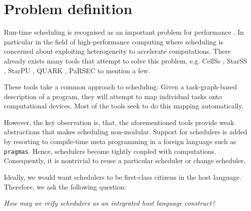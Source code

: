 \documentclass[preprint,10pt,numbers]{sigplanconf}
\begin{document}


  \section{Problem definition}
Run-time scheduling is recognised as an important problem for performance \cite{Augonnet2011,Augonnet2012,Agullo2015}. In particular in the field of high-performance computing where scheduling is concerned about exploiting heterogeneity to accelerate computations. There already exists many tools that attempt to solve this problem, e.g. CellSs \cite{Bellens2009}, StarSS \cite{Planas2009}, StarPU \cite{Augonnet2011}, QUARK \cite{YarKhan2011}, PaRSEC \cite{Bosilca2013} to mention a few.

These tools take a common approach to scheduling: Given a task-graph-based description of a program, they will attempt to map individual tasks onto computational devices. Most of the tools seek to do this mapping automatically.

However, the key observation is, that, the aforementioned tools provide weak abstractions that makes scheduling non-modular. Support for schedulers is added by resorting to compile-time meta programming in a foreign language such as \texttt{pragmas}. Hence, schedulers become tightly coupled with computations. Consequently, it is nontrivial to reuse a particular scheduler or change scheduler.

Ideally, we would want schedulers to be first-class citizens in the host language. Therefore, we ask the following question:
\begin{center}
  \emph{How may we reify schedulers as an integrated host language construct?}
\end{center}
\end{document}
